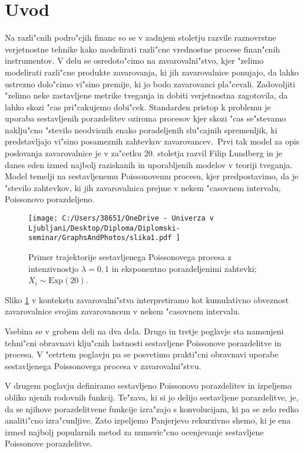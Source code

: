 \documentclass[12pt, a4paper, reqno]{amsart}
\theoremstyle{definition}
\theoremstyle{plain}
\newcommand{\1}{\mathds{1}}
\begin{document}
\section{Uvod}
Na razli"cnih podro"cjih financ so se v zadnjem stoletju razvile raznovrstne verjetnostne tehnike kako 
modelirati razli"cne vrednostne procese finan"cnih instrumentov. V delu se osredoto"cimo na zavarovalni"stvo, 
kjer "zelimo modelirati razli"cne produkte zavarovanja, ki jih zavarovalnice ponujajo, da lahko ustrezno dolo"cimo vi"sino premije, ki jo
bodo zavarovanci pla"cevali.  Zadovoljiti "zelimo neke zastavljene metrike tveganja in dobiti verjetnostna zagotovila, 
da lahko skozi "cas pri"cakujemo dobi"cek. 
Standarden pristop k problemu je uporaba sestavljenih porazdelitev oziroma procesov kjer skozi "cas se"stevamo naklju"cno "stevilo 
neodvisnih enako poradeljenih slu"cajnih spremenljik, ki predstavljajo vi"sino posameznih zahtevkov zavarovancev.\ Prvi tak model za opis
poslovanja zavarovalnice 
je v za"cetku 20. stoletja razvil Filip Lundberg in je danes eden izmed najbolj raziskanih in 
uporabljenih modelov v teoriji tveganja. Model temelji na sestavljenemu Poissonovemu procesu, kjer predpostavimo, da je "stevilo zahtevkov,
ki jih zavarovalnica prejme v nekem "casovnem intervalu, Poissonovo porazdeljeno.

    \begin{figure}[H]
        \centering
        \texttt{[image: 
            C:/Users/38651/OneDrive - Univerza v Ljubljani/Desktop/Diploma/Diplomski-seminar/GraphsAndPhotos/slika1.pdf
            ]}
        \caption{Primer trajektorije sestavljenega Poissonovega procesa z intenzivnostjo $\lambda = 0{,}1$ in
        eksponentno porazdeljenimi zahtevki; $X_i\sim\text{Exp}(20)$.}
        \label{fig:slika1}
    \end{figure}
    \noindent
    Sliko \ref{fig:slika1} v kontekstu zavarovalni"stva interpretiramo kot kumulativno obveznost zavarovalnice 
    svojim zavarovancem v nekem "casovnem intervalu. 

    Vsebina se v grobem deli na dva dela. Drugo in tretje poglavje sta namenjeni tehni"cni obravnavi klju"cnih lastnosti 
    sestavljene Poissonove porazdelitve in procesa. V "cetrtem poglavju pa se posvetimo prakti"cni obravnavi uporabe sestavljenega
    Poissonovega procesa v zavarovalni"stvu. 

    V drugem poglavju definiramo sestavljeno Poissonovo porazdelitev in izpeljemo obliko njenih rodovnih funkcij.
    Te"zava, ki si jo delijo sestavljene porazdelitve, je, da se njihove porazdelitvene funkcije izra"zajo 
    s konvolucijam, ki pa se zelo redko analiti"cno izra"cunljive. Zato izpeljemo Panjerjevo rekurzivno shemo, ki 
    je ena izmed najbolj popularnih metod za numeric"cno ocenjevanje sestavljene Poissonove porazdelitve.
\end{document}
